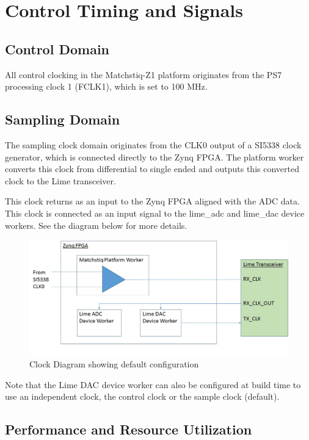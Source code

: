 \documentclass{article}
\edef\ecomp{matchstiq_z1}
\begin{document}
\pagebreak
\section*{Control Timing and Signals}
\subsection*{Control Domain}
All control clocking in the Matchstiq-Z1 platform originates from the PS7 processing clock 1 (FCLK1), which is set to 100 MHz.

\subsection*{Sampling Domain}
The sampling clock domain originates from  the CLK0 output of a SI5338 clock generator, which is connected directly to the Zynq FPGA. The platform worker converts this clock from differential to single ended and outputs this converted clock to the Lime transceiver.\par\medskip
\noindent This clock returns as an input to the Zynq FPGA aligned with the ADC data. This clock is connected as an input signal to the lime\_adc and lime\_dac device workers. See the diagram below for more details.\par\medskip
\begin{figure}[ht]
	\centerline{\includegraphics[scale=0.5]{matchstiq_sample_clock_diagram}}
	\caption{Clock Diagram showing default configuration}
	\label{fig:clk}
\end{figure}
\noindent Note that the Lime DAC device worker can also be configured at build time to use an independent clock, the control clock or the sample clock (default).
\newpage

\begin{landscape}
\section*{Performance and Resource Utilization}

\end{landscape}
\end{document}
